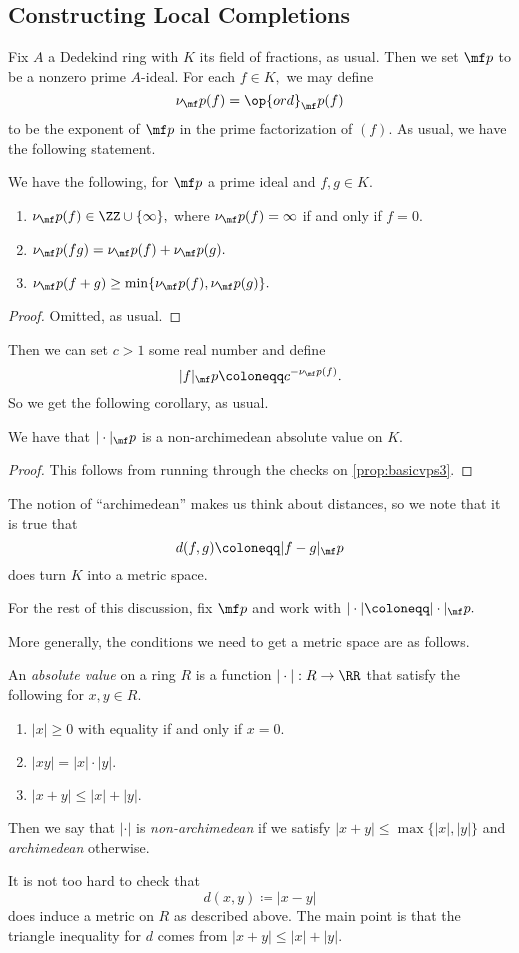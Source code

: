 \documentclass[../notes.tex]{subfiles}
\begin{document}
\subsection{Constructing Local Completions}
Fix $A$ a Dedekind ring with $K$ its field of fractions, as usual. Then we set $\mf p$ to be a nonzero prime $A$-ideal. For each $f\in K,$ we may define
\[\nu_\mf p(f)=\op{ord}_\mf p(f)\]
to be the exponent of $\mf p$ in the prime factorization of $(f).$ As usual, we have the following statement.
\begin{proposition} \label{prop:basicvps3}
	We have the following, for $\mf p$ a prime ideal and $f,g\in K.$
	\begin{enumerate}[label=(\alph*)]
		\item $\nu_\mf p(f)\in\ZZ\cup\{\infty\},$ where $\nu_\mf p(f)=\infty$ if and only if $f=0.$
		\item $\nu_\mf p(fg)=\nu_\mf p(f)+\nu_\mf p(g).$
		\item $\nu_\mf p(f+g)\ge\min\{\nu_\mf p(f),\nu_\mf p(g)\}.$
	\end{enumerate}
\end{proposition}
\begin{proof}
	Omitted, as usual.
\end{proof}
Then we can set $c>1$ some real number and define
\[|f|_\mf p\coloneqq c^{-\nu_\mf p(f)}.\]
So we get the following corollary, as usual.
\begin{corollary}
	We have that $|\cdot|_\mf p$ is a non-archimedean absolute value on $K.$
\end{corollary}
\begin{proof}
	This follows from running through the checks on \autoref{prop:basicvps3}.
\end{proof}
The notion of ``archimedean'' makes us think about distances, so we note that it is true that
\[d(f,g)\coloneqq |f-g|_\mf p\]
does turn $K$ into a metric space.
\begin{warn}
	For the rest of this discussion, fix $\mf p$ and work with $|\cdot|\coloneqq |\cdot|_\mf p.$
\end{warn}
More generally, the conditions we need to get a metric space are as follows.
\begin{definition}
	An \textit{absolute value} on a ring $R$ is a function $|\cdot|:R\to\RR$ that satisfy the following for $x,y\in R.$
	\begin{enumerate}[label=(\alph*)]
		\item $|x|\ge0$ with equality if and only if $x=0.$
		\item $|xy|=|x|\cdot|y|.$
		\item $|x+y|\le|x|+|y|.$
	\end{enumerate}
	Then we say that $|\cdot|$ is \textit{non-archimedean} if we satisfy $|x+y|\le\max\{|x|,|y|\}$ and \textit{archimedean} otherwise.
\end{definition}
It is not too hard to check that
\[d(x,y)\coloneqq |x-y|\]
does induce a metric on $R$ as described above. The main point is that the triangle inequality for $d$ comes from $|x+y|\le|x|+|y|.$
\end{document}
